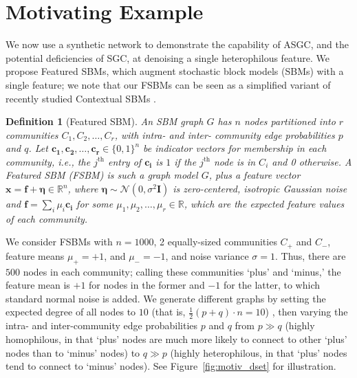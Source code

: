 \documentclass{article}
\newcommand{\tp}{{\scriptscriptstyle +}}
\newcommand{\tm}{{\scriptscriptstyle -}}
\newtheorem{definition}{Definition}
\begin{document}
\section{Motivating Example}\label{sec:motivating}
We now use a synthetic network to demonstrate the capability of ASGC, and the potential deficiencies of SGC, at denoising a single heterophilous feature. We propose Featured SBMs, which augment stochastic block models (SBMs) \citep{holland1983stochastic} with a single feature; we note that our FSBMs can be seen as a simplified variant of recently studied Contextual SBMs \citep{deshpande2018contextual}.
%
\begin{definition}[Featured SBM]\label{defn:fsbm}
An SBM graph $G$ has $n$ nodes partitioned into $r$ communities $C_1,C_2,\dots,C_r$, with intra- and inter- community edge probabilities $p$ and $q$. Let $\bm{c_1},\bm{c_2},\dots,\bm{c_r} \in \{0,1\}^n$ be indicator vectors for membership in each community, i.e., the $j^\text{th}$ entry of $\bm{c_i}$ is $1$ if the $j^\text{th}$ node is in $C_i$ and 0 otherwise. A Featured SBM (FSBM) is such a graph model $G$, plus a feature vector $\bm{x} = \bm{f} + \bm{\eta} \in \mathbb{R}^n$, where $\bm{\eta} \sim \mathcal{N}(0, \sigma^2 \bm{I})$ is zero-centered, isotropic Gaussian noise and $\bm{f} = \sum_i \mu_i \bm{c_i}$ for some $\mu_1, \mu_2, \dots, \mu_r \in \mathbb{R}$, which are the expected feature values of each community.
\end{definition}
%
We consider FSBMs with $n=1000$, 2 equally-sized communities $C_\tp$ and $C_\tm$, feature means $\mu_\tp = +1$, and $\mu_- = -1$, and noise variance $\sigma=1$. 
Thus, there are $500$ nodes in each community; calling these communities `plus' and `minus,' the feature mean is $+1$ for nodes in the former and $-1$ for the latter, to which standard normal noise is added. We generate different graphs by setting the expected degree of all nodes to $10$ 
(that is, ${\scriptstyle \frac{1}{2}} (p+q) \cdot n =10$)
, then varying the intra- and inter-community edge probabilities $p$ and $q$ from $p \gg q$ (highly homophilous, in that `plus' nodes are much more likely to connect to other `plus' nodes than to `minus' nodes) to $q \gg p$ (highly heterophilous, in that `plus' nodes tend to connect to `minus' nodes).  See Figure~\ref{fig:motiv_dset} for illustration.
\end{document}
